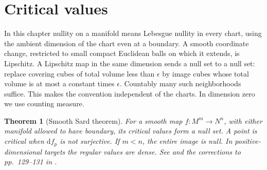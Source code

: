 \documentclass[11pt,oneside,openany]{book}
\newtheorem{theorem}{Theorem}[chapter]
\theoremstyle{definition}
\theoremstyle{remark}
\newcommand{\dd}{\mathrm d}
\begin{document}
\section{Critical values}

In this chapter nullity on a manifold means Lebesgue nullity in every chart, using the ambient dimension of the chart even at a boundary. A smooth coordinate change, restricted to small compact Euclidean balls on which it extends, is Lipschitz. A Lipschitz map in the same dimension sends a null set to a null set: replace covering cubes of total volume less than \(\epsilon\) by image cubes whose total volume is at most a constant times \(\epsilon\). Countably many such neighborhoods suffice. This makes the convention independent of the charts. In dimension zero we use counting measure.

\begin{theorem}[Smooth Sard theorem]\label{p104:M04.01}
For a smooth map \(f:M^m\to N^n\), with either manifold allowed to have boundary, its critical values form a null set. A point is critical when \(\dd f_p\) is not surjective. If \(m<n\), the entire image is null. In positive-dimensional targets the regular values are dense. See \cite[Theorem 6.10 and Corollaries 6.11--6.12]{lee} and the corrections to pp.\ 129--131 in \cite{leeerrata}.
\end{theorem}
\end{document}
